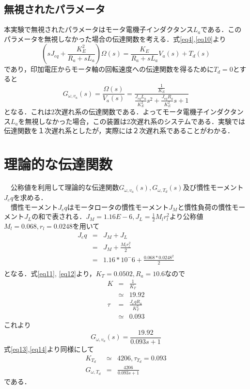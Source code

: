 \documentclass[11pt,a4paper]{jsarticle}
\begin{document}
  \subsection{無視されたパラメータ}
  本実験で無視されたパラメータはモータ電機子インダクタンス$L_a$である．このパラメータを無視しなかった場合の伝達関数を考える．式\ref{eq4},\ref{eq10}より
  \begin{equation}
   (sJ_{eq} + \frac{K_E^2}{R_a + sL_a})\Omega(s) = \frac{K_E}{R_a + sL_a}V_a(s) + T_d(s)
  \end{equation}
  であり，印加電圧からモータ軸の回転速度への伝達関数を得るために$T_d = 0$とすると
  \begin{equation}
   G_{\omega , v_a}(s) = \frac{\Omega(s)}{V_a(s)} = \frac{\frac{1}{K_E}}{\frac{J_{eq} L_a}{K_E^2} s^2 + \frac{J_{eq} R_a}{K_E^2} s + 1} 
  \end{equation}
  となる．これは2次遅れ系の伝達関数である．よってモータ電機子インダクタンス$L_a$を無視しなかった場合，この装置は2次遅れ系のシステムである．実験では伝達関数を１次遅れ系としたが，実際には２次遅れ系であることがわかる．

\newpage
\thispagestyle{fancy}
\cfoot{}

 \section{理論的な伝達関数}
 　公称値を利用して理論的な伝達関数$G_{\omega , v_a}(s), G_{\omega , T_d}(s)$及び慣性モーメント$J_eq$を求める．\\
 　慣性モーメント$J_eq$はモータロータの慣性モーメント$J_M$と慣性負荷の慣性モーメント$J_L$の和で表される．$J_M = 1.16E-6, J_L = \frac{1}{2} M_l r_l^2$より公称値$M_l = 0.068, r_l = 0.0248$を用いて
 \begin{eqnarray*}
  J_eq & = & J_M + J_L \\
       & = & J_M + \frac{M_l r_l^2}{2} \\
       & = & 1.16 * 10^-6 + \frac{0.068 * 0.0248^2}{2} \\
 \end{eqnarray*}
 となる．式\ref{eq11}, \ref{eq12}より，$K_T = 0.0502, R_a = 10.6$なので
 \begin{eqnarray*}
 K & = & \frac{1}{K_T} \\
   & \simeq & 19.92 \\
\tau & = & \frac{J_eq R_a}{K_T^2} \\
     & \simeq & 0.093
 \end{eqnarray*}
これより
\begin{equation}
 G_{\omega , v_a}(s) = \frac{19.92}{0.093s + 1}
\end{equation}
式\ref{eq13},\ref{eq14}より同様にして
\begin{eqnarray*}
K_{T_d} & \simeq & 4206 , \tau_{T_d} = 0.093 \\
 G_{\omega , T_d} & = & \frac{4206}{0.093s + 1}
\end{eqnarray*}
である．
\end{document}
